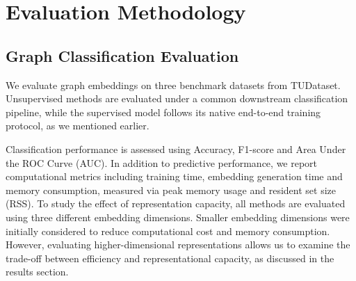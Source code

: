 \section{Evaluation Methodology}








\subsection{Graph Classification Evaluation}
We evaluate graph embeddings on three benchmark datasets from TUDataset.
Unsupervised methods are evaluated under a common downstream
classification pipeline, while the supervised model follows its native
end-to-end training protocol, as we mentioned earlier.

Classification performance is assessed using Accuracy, F1-score and Area Under the ROC Curve (AUC).
In addition to predictive performance, we report computational metrics including
training time, embedding generation time and memory consumption, measured via
peak memory usage and resident set size (RSS).
To study the effect of representation capacity, all methods are evaluated using three different
embedding dimensions. Smaller embedding dimensions were initially considered to reduce computational cost and memory consumption.
However, evaluating higher-dimensional representations allows us to examine the trade-off between efficiency
and representational capacity, as discussed in the results section.



